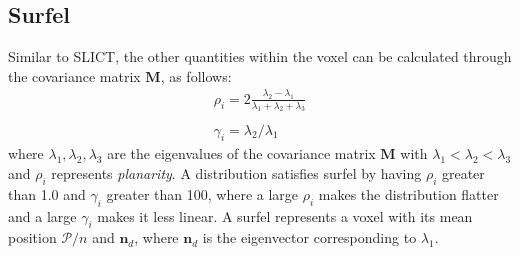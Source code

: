 \documentclass[letterpaper, 10 pt, conference]{ieeeconf}  %
\begin{document}

\subsection{Surfel}
\label{sec:surfel}
Similar to SLICT, the other quantities within the voxel can be calculated through the covariance matrix $\boldsymbol{M}$, as follows:
\begin{equation}
        \begin{array}{c}
                \rho_i = 2 \displaystyle{\frac{\lambda_2 - \lambda_1}{\lambda_1 + \lambda_2 + \lambda_3}} \\
                \\
                \gamma_i =  \displaystyle{\lambda_2 / \lambda_1}
        \end{array}
        \label{eq_planarity}
\end{equation}
where $\lambda_1, \lambda_2, \lambda_3$ are the eigenvalues of the covariance matrix $\boldsymbol{M}$ with $\lambda_1 < \lambda_2 < \lambda_3$ and $\rho_i$ represents \emph{planarity}.
A distribution satisfies surfel by having $\rho_i$ greater than 1.0 and $\gamma_i$ greater than 100, where a large $\rho_i$ makes the distribution flatter and a large $\gamma_i$ makes it less linear.
A surfel represents a voxel with its mean position $\mathcal{P} / n$ and $\boldsymbol{n}_d$, where $\boldsymbol{n}_d$ is the eigenvector corresponding to $\lambda_1$.
\end{document}
